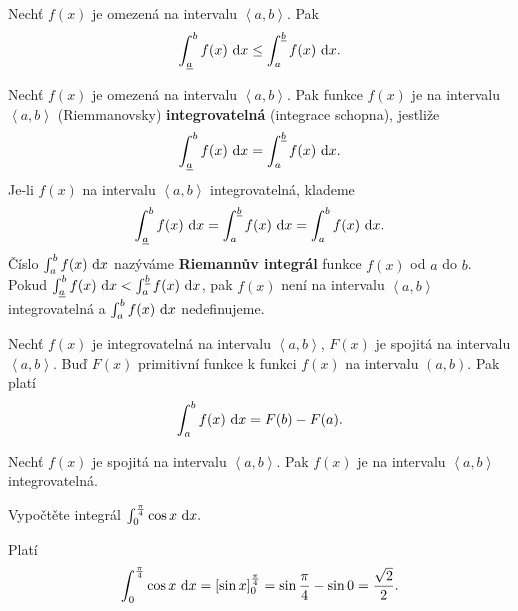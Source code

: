 \begin{veta}
Nechť $f(x)$ je omezená na intervalu $\left<  a,b \right>. $ Pak
$$\int_{\underline{a}} ^b f(x)\, \mathop{}\!\mathrm{d} x \leq \int_{a} ^{\underline{b}} f(x) \, \mathop{}\!\mathrm{d} x.$$
\end{veta}

\begin{definition}
Nechť $f(x)$ je omezená na intervalu $\left<  a,b \right> .$ Pak funkce
$f(x)$ je na intervalu $\left<  a,b \right> $ (Riemmanovsky) \textbf{integrovatelná}
(integrace schopna), jestliže
$$\int_{\underline{a}} ^b f(x)\, \mathop{}\!\mathrm{d} x = \int_{a} ^{\underline{b}} f(x) \, \mathop{}\!\mathrm{d} x.$$
Je-li $f(x)$ na intervalu $\left<  a,b \right> $ integrovatelná, klademe
$$\int_{\underline{a}} ^b f(x)\, \mathop{}\!\mathrm{d} x = \int_{a} ^{\underline{b}} f(x) \, \mathop{}\!\mathrm{d} x = \int_{a} ^b f(x) \, \mathop{}\!\mathrm{d} x.$$
Číslo $\int_{a} ^b f(x)\, \mathop{}\!\mathrm{d} x$ nazýváme \textbf{Riemannův integrál} funkce $f(x)$ od
$a$ do $b$. Pokud $\int_{\underline{a}} ^b f(x)\, \mathop{}\!\mathrm{d} x < \int_{a} ^{\underline{b}} f(x) \, \mathop{}\!\mathrm{d} x$,
pak $f(x)$ není na intervalu $\left<  a,b \right> $ integrovatelná a
$\int_{a} ^b f(x)\, \mathop{}\!\mathrm{d} x$ nedefinujeme.
\end{definition}

\begin{veta}
Nechť $f(x)$ je integrovatelná na intervalu $\left<  a,b \right>$, $F(x)$ je spojitá
na intervalu $\left<  a,b \right> $. Buď $F(x)$ primitivní funkce k funkci $f(x)$
na intervalu $\left ( a,b \right ) $. Pak platí
$$\int_{a} ^b f(x)\, \mathop{}\!\mathrm{d} x=F(b)-F(a).$$
\end{veta}

\begin{veta}
Nechť $f(x)$ je spojitá na intervalu $\left<  a,b \right> $. Pak $f(x)$ je na
intervalu $\left<  a,b \right> $ integrovatelná.
\end{veta}

\begin{priklad}
Vypočtěte integrál $\int_0^{\frac{\pi}{4}}\cos x \, \mathop{}\!\mathrm{d} x.$
\end{priklad}

\begin{reseni}
Platí
$$\int_0^{\frac{\pi}{4}}\cos x \, \mathop{}\!\mathrm{d} x=\left [ \sin x  \right ]_0^{\frac{\pi}{4}}=\sin \frac{\pi}{4}-\sin 0=\frac{\sqrt{2} }{2}. $$
\end{reseni}

